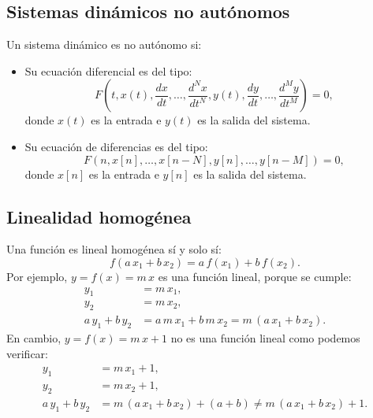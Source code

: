 \documentclass[11pt,a4paper,openany]{book}
\begin{document}
\subsection{Sistemas dinámicos no autónomos}
Un sistema dinámico es no autónomo si:
\begin{itemize}
	\item Su ecuación diferencial es del tipo:
	\begin{equation}
		F\left(t, x(t), \frac{dx}{dt}, \dots, \frac{d^{N}x}{dt^{N}}, y(t), \frac{dy}{dt}, \dots, \frac{d^{M}y}{dt^{M}}\right) = 0,
	\end{equation}
	donde $x(t)$ es la entrada e $y(t)$ es la salida del sistema.
	\item Su ecuación de diferencias es del tipo:
	\begin{equation}
		F(n, x[n], \dots, x[n-N], y[n], \dots, y[n-M]) = 0, 
	\end{equation}
	donde $x[n]$ es la entrada e $y[n]$ es la salida del sistema.
\end{itemize}

\subsection{Linealidad homogénea}
Una función es lineal homogénea sí y solo sí:
\begin{equation}
	f(a \, x_{1} + b \, x_{2}) = a \, f(x_{1}) + b \, f(x_{2}).
\end{equation}
Por ejemplo, $y = f(x) = m \, x$ es una función lineal, porque se cumple:
\begin{equation}
	\begin{array}{ll}
		y_{1} & = m \, x_{1}, \\ 
		y_{2} & = m \, x_{2}, \\ 
		a \, y_{1}+ b \, y_{2} & = a \, m \, x_{1} + b \, m \, x_{2} = m \, (a \, x_{1}+ b \, x_{2}).
	\end{array}
\end{equation}
En cambio, $y = f(x) = m \, x + 1$ no es una función lineal como podemos verificar:
\begin{equation}
	\begin{array}{ll}
		y_{1} & = m \, x_{1}+1, \\ 
		y_{2} & = m \, x_{2}+1, \\ 
		a \, y_{1}+ b \, y_{2} & = m \, (a\, x_{1}+ b \, x_{2}) + (a+b) \neq m \, (a \, x_{1}+b \, x_{2}) + 1.
	\end{array}
\end{equation}
\end{document}
